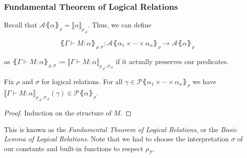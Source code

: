 \documentclass[aspectratio=169]{beamer}
\begin{document}
\begin{frame}
\frametitle{Fundamental Theorem of Logical Relations}

Recall that $\mathcal{A}\lBrace \alpha \rBrace_{\rho} = \llbracket\alpha \rrbracket_{\rho_{\mathcal{A}}}$.
Thus, we can define

\[
\lBrace \Gamma \vdash M : \alpha \rBrace_{\rho, \sigma} : \mathcal{A}\lBrace \alpha_1 \times \cdots \times \alpha_n \rBrace_\rho \to \mathcal{A}\lBrace \alpha \rBrace_\rho
\]

as $\lBrace \Gamma \vdash M : \alpha \rBrace_{\rho, \sigma} := \llbracket \Gamma \vdash M : \alpha \rrbracket_{\rho_{\mathcal{A}}, \sigma_{\mathcal{A}}}$ if it actually preserves our predicates.

\medskip
\pause

\begin{theorem}
    Fix $\rho$ and $\sigma$ for logical relations.
    For all $\gamma \in \mathcal{P}\lBrace \alpha_1 \times \cdots \times \alpha_n \rBrace_\rho$ we have $\llbracket \Gamma \vdash M : \alpha \rrbracket_{\rho_{\mathcal{A}}, \sigma_{\mathcal{A}}}(\gamma) \in \mathcal{P}\lBrace \alpha \rBrace_\rho$.
    \begin{proof}
        Induction on the structure of $M$.
    \end{proof}
\end{theorem}

\medskip
\pause

This is known as the \emph{Fundamental Theorem of Logical Relations}, or the \emph{Basic Lemma of Logical Relations}.
Note that we had to choose the interpretation $\sigma$ of our constants and built-in functions to respect $\rho_{\mathcal{P}}$.
\end{frame}
\end{document}
